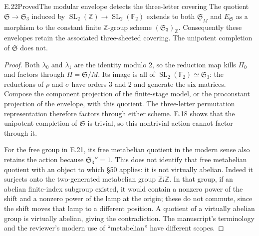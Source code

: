 \begin{statement}{E.22}{Proved}{The modular envelope detects the three-letter covering}
The quotient \(\mathfrak S\to\mathfrak S_3\) induced by
\(\operatorname{SL}_2(\mathbb Z)\to\operatorname{SL}_2(\mathbb F_2)\)
extends to both \(\underline{\mathfrak S}_M\) and
\(E_{\mathfrak S}\) as a morphism to the constant finite
\(\mathbb Z\)-group scheme \((\mathfrak S_3)_{\mathbb Z}\).
Consequently these envelopes retain the associated three-sheeted
covering.  The unipotent completion of \(\mathfrak S\) does not.
\end{statement}
\begin{proof}
Both \(\lambda_0\) and \(\lambda_1\) are the identity modulo 2,
so the reduction map kills \(\Pi_0\) and factors through
\(H=\mathfrak S/M\).  Its image is all of
\(\operatorname{SL}_2(\mathbb F_2)\simeq\mathfrak S_3\): the
reductions of \(\rho\) and \(\sigma\) have orders 3 and 2 and
generate the six matrices.  Compose the component projection
of the finite-stage model, or the proconstant projection of
the envelope, with this quotient.  The three-letter permutation
representation therefore factors through either scheme.  E.18
shows that the unipotent completion of \(\mathfrak S\) is trivial,
so this nontrivial action cannot factor through it.

For the free group in E.21, its free metabelian quotient in the
modern sense also retains the action because
\(\mathfrak S_3''=1\).  This does not identify that free
metabelian quotient with an object to which \S50 applies: it is
not virtually abelian.  Indeed it surjects onto the two-generated
metabelian group \(\mathbb Z\wr\mathbb Z\).  In that group, if
an abelian finite-index subgroup existed, it would contain a
nonzero power of the shift and a nonzero power of the lamp at
the origin; these do not commute, since the shift moves that
lamp to a different position.  A quotient of a virtually abelian
group is virtually abelian, giving the contradiction.
The manuscript's terminology and the
reviewer's modern use of ``metabelian'' have different scopes.
\end{proof}

